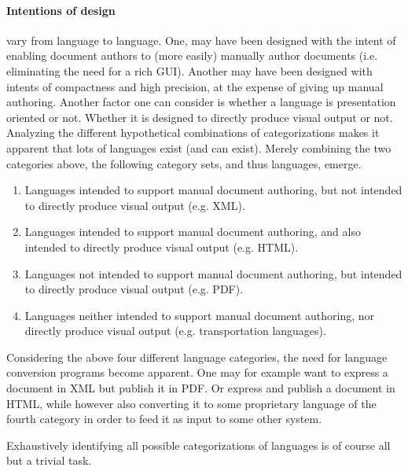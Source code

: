 \documentclass{scrreprt}
\begin{document}
\paragraph{Intentions of design} vary from language to language. One, may have been designed with the intent of enabling document authors to (more easily) manually author documents (i.e. eliminating the need for a rich GUI). Another may have been designed with intents of compactness and high precision, at the expense of giving up manual authoring. Another factor one can consider is whether a language is presentation oriented or not. Whether it is designed to directly produce visual output or not. Analyzing the different hypothetical combinations of categorizations makes it apparent that lots of languages exist (and can exist). Merely combining the two categories above, the following category sets, and thus languages, emerge.

\begin{enumerate}
\item Languages intended to support manual document authoring, but not intended to directly produce visual output (e.g. XML).
\item Languages intended to support manual document authoring, and also intended to directly produce visual output (e.g. HTML).
\item Languages not intended to support manual document authoring, but intended to directly produce visual output (e.g. PDF).
\item Languages neither intended to support manual document authoring, nor directly produce visual output (e.g. transportation languages).
\end{enumerate}

Considering the above four different language categories, the need for language conversion programs become apparent. One may for example want to express a document in XML but publish it in PDF. Or express and publish a document in HTML, while however also converting it to some proprietary language of the fourth category in order to feed it as input to some other system.

Exhaustively identifying all possible categorizations of languages is of course all but a trivial task.
\end{document}
